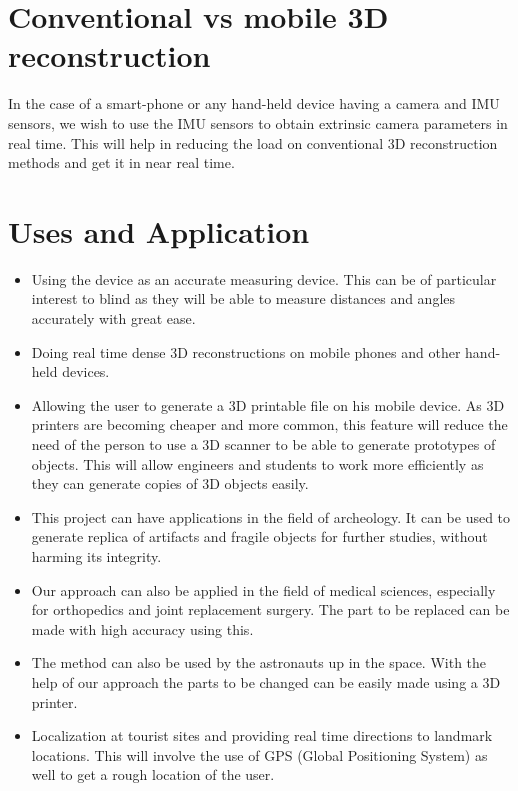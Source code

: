 \documentclass{article}
\begin{document}
			\section{Conventional vs mobile 3D reconstruction}
				In the case of a smart-phone or any hand-held device having a camera and IMU sensors, we wish to use  the IMU sensors to obtain extrinsic camera parameters in real time. This will help in reducing the load on conventional 3D reconstruction methods and get it in near real time.

	

	\section{Uses and Application}
			\begin{itemize}
				\item Using the device as an accurate measuring device. This can be of particular interest to blind as they will be able to measure distances and angles accurately with great ease.
				\item Doing real time dense 3D reconstructions on mobile phones and other hand-held devices. 
				\item Allowing the user to generate a 3D printable file on his mobile device. As 3D printers are becoming cheaper and more common, this feature will reduce the need of the person to use a 3D scanner to be able to generate prototypes of objects. This will allow engineers and students to work more efficiently as they can generate copies of 3D objects easily.
				\item This project can have applications in the field of archeology. It can be used to generate replica of artifacts and fragile objects for further studies, without harming its integrity.
				\item Our approach can also be applied in the field of medical sciences, especially for orthopedics and joint replacement surgery. The part to be replaced can be made with high accuracy using this.
				\item The method can also be used by the astronauts up in the space. With the help of our approach the parts to be changed can be easily made using a 3D printer.
				\item Localization at tourist sites and providing real time directions to landmark locations. This will involve the use of GPS (Global Positioning System) as well to get a rough location of the user.
			\end{itemize}
\end{document}
